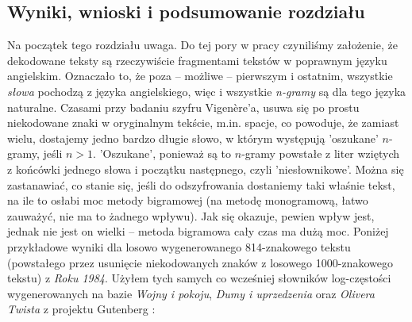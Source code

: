 \documentclass[a4paper]{article}
\theoremstyle{defn}
\theoremstyle{theorem}
\theoremstyle{lemma}
\theoremstyle{cor}
\theoremstyle{fact}
\begin{document}
\subsection{Wyniki, wnioski i podsumowanie rozdziału}
\label{sect4.8}
Na początek tego rozdziału uwaga. Do tej pory w pracy czyniliśmy założenie, że dekodowane teksty są rzeczywiście fragmentami tekstów w poprawnym języku angielskim. Oznaczało to, że poza – możliwe – pierwszym i ostatnim, wszystkie \textit{słowa} pochodzą z języka angielskiego, więc i wszystkie \textit{n-gramy} są dla tego języka naturalne. Czasami przy badaniu szyfru Vigenère'a, usuwa się po prostu niekodowane znaki w oryginalnym tekście, m.in. spacje, co powoduje, że zamiast wielu, dostajemy jedno bardzo długie słowo, w którym występują 'oszukane' $n$-gramy, jeśli $n>1$. 'Oszukane', ponieważ są to $n$-gramy powstałe z liter wziętych z końcówki jednego słowa i początku następnego, czyli 'niesłownikowe'. Można się zastanawiać, co stanie się, jeśli do odszyfrowania dostaniemy taki właśnie tekst, na ile to osłabi moc metody bigramowej (na metodę monogramową, łatwo zauważyć, nie ma to żadnego wpływu). Jak się okazuje, pewien wpływ jest, jednak nie jest on wielki – metoda bigramowa cały czas ma dużą moc. Poniżej przykładowe wyniki dla losowo wygenerowanego 814-znakowego tekstu (powstałego przez usunięcie niekodowanych znaków z losowego 1000-znakowego tekstu) z  \textit{Roku 1984}. Użyłem tych samych co wcześniej słowników log-częstości wygenerowanych na bazie \textit{Wojny i pokoju}, \textit{Dumy i uprzedzenia} oraz \textit{Olivera Twista} z projektu Gutenberg \cite{gutenberg}:\\
\end{document}
